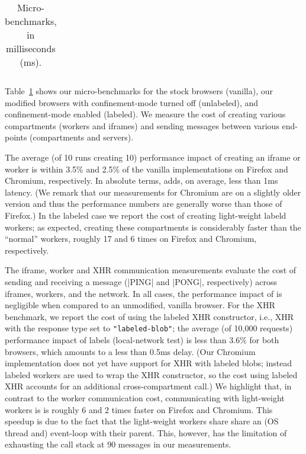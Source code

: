 \begin{table}
{\begin{tabular}{l |c|c|c|c|c|c }
\\\bottomrule
\end{tabular}
}
\caption{Micro-benchmarks, in milliseconds (ms).}
\label{microbench} 
\end{table}

Table~\ref{microbench} shows our micro-benchmarks for the stock
browsers (vanilla), our modified browsers with confinement-mode turned
off (unlabeled), and confinement-mode enabled (labeled).
%
We measure the cost of creating various compartments (workers and
iframes) and sending messages between various end-points
(compartments and servers).

The average (of 10 runs creating 10) performance impact of creating an
iframe or worker is within 3.5\% and 2.5\% of the vanilla
implementations on Firefox and Chromium, respectively.
%
In absolute terms, \sys{} adds, on average, less than 1ms latency.
%
(We remark that our measurements for Chromium are on a slightly older
version and thus the performance numbers are generally worse than
those of Firefox.)
%
In the labeled case we report the cost of creating light-weight labeld
workers; as expected, creating these compartments is considerably
faster than the ``normal'' workers, roughly 17 and 6 times on Firefox
and Chromium, respectively.

%
The iframe, worker and XHR communication measurements evaluate the
cost of sending and receiving a message (\js|PING| and \js|PONG|,
respectively) across iframes, workers, and the network.
%
In all cases, the performance impact of \sys{} is negligible when
compared to an unmodified, vanilla browser.
%
For the XHR benchmark, we report the cost of using the labeled XHR
constructor, i.e., XHR with the response type set to
\verb|"labeled-blob"|; the average (of 10,000 requests) performance
impact of labels (local-network test) is less than 3.6\% for both
browsers, which amounts to a less than 0.5ms delay.
%
(Our Chromium implementation does not yet have support for XHR with
labeled blobs; instead labeled workers are used to wrap the XHR
constructor, so the cost using labeled XHR accounts for an additional
cross-compartment call.)
%
We highlight that, in contrast to the worker communication cost,
communicating with light-weight workers is is roughly 6 and 2 times
faster on Firefox and Chromium.
%
This speedup is due to the fact that the light-weight workers share
share an (OS thread and) event-loop with their parent.
%
This, however, has the limitation of exhausting the call stack at 90
messages in our measurements.


